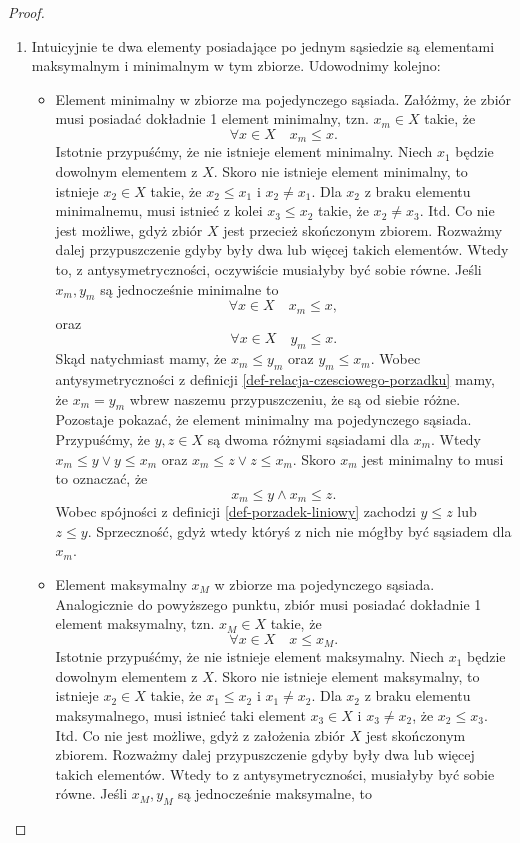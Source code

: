 \documentclass[12pt,a4paper]{report}
\begin{document}
\begin{proof}
\begin{enumerate}
\item Intuicyjnie te dwa elementy posiadające po jednym sąsiedzie są elementami maksymalnym i minimalnym w tym zbiorze. Udowodnimy kolejno:
\begin{itemize}
\item Element minimalny w zbiorze ma pojedynczego sąsiada. Załóżmy, że zbiór musi posiadać dokładnie 1 element minimalny, tzn. $x_m \in X$ takie, że 
$$
\forall x \in X \quad x_m \leq x.
$$
Istotnie przypuśćmy, że nie istnieje element minimalny. Niech $x_1$ będzie dowolnym elementem z $X$. Skoro nie istnieje element minimalny, to istnieje $x_2 \in X$ takie, że $x_2 \leq x_1$ i $x_2 \neq x_1$. Dla $x_2$ z braku elementu minimalnemu, musi istnieć z kolei $x_3 \leq x_2$ takie, że $x_2 \neq x_3$. Itd. Co nie jest możliwe, gdyż zbiór $X$ jest przecież skończonym zbiorem.
Rozważmy dalej przypuszczenie gdyby były dwa lub więcej takich elementów. Wtedy to, z antysymetryczności, oczywiście musiałyby być sobie równe. Jeśli $x_m, y_m$ są jednocześnie minimalne to
$$
\forall x \in X \quad x_m \leq x,
$$
oraz 
$$
\forall x \in X \quad y_m \leq x.
$$
Skąd natychmiast mamy, że $ x_m \leq y_m$ oraz $y_m \leq x_m$. Wobec antysymetryczności z definicji \ref{def-relacja-czesciowego-porzadku} mamy, że $x_m = y_m$ wbrew naszemu przypuszczeniu, że są od siebie różne.
Pozostaje pokazać, że element minimalny ma pojedynczego sąsiada. Przypuśćmy, że $y,z \in X$ są dwoma różnymi sąsiadami dla $x_m$. Wtedy $ x_m \leq y \lor y \leq x_m$ oraz $ x_m \leq z \lor z \leq x_m$. Skoro $x_m$ jest minimalny to musi to oznaczać, że
$$
x_m \leq y \land x_m \leq z.
$$ 
Wobec spójności z definicji \ref{def-porzadek-liniowy} zachodzi $y \leq z$ lub $z \leq y$. Sprzeczność, gdyż wtedy któryś z nich nie mógłby być sąsiadem dla $x_m$.
\item Element maksymalny $x_M$ w zbiorze ma pojedynczego sąsiada. Analogicznie do powyższego punktu, zbiór musi posiadać dokładnie 1 element maksymalny, tzn. $x_M \in X$ takie, że
$$\forall x \in X \quad x \leq x_M.$$
Istotnie przypuśćmy, że nie istnieje element maksymalny. Niech $x_1$ będzie dowolnym elementem z $X$. Skoro nie istnieje element maksymalny, to istnieje $x_2 \in X$ takie, że $x_1 \leq x_2$ i $x_1 \neq x_2$. Dla $x_2$ z braku elementu maksymalnego, musi istnieć taki element $x_3 \in X$ i $x_3 \neq x_2$, że $x_2 \leq x_3$. Itd. Co nie jest możliwe, gdyż z założenia zbiór $X$ jest skończonym zbiorem.
Rozważmy dalej przypuszczenie gdyby były dwa lub więcej takich elementów. Wtedy to z antysymetryczności, musiałyby być sobie równe. Jeśli $x_M, y_M$ są jednocześnie maksymalne, to 

\end{itemize}
\end{enumerate}
\end{proof}
\end{document}
